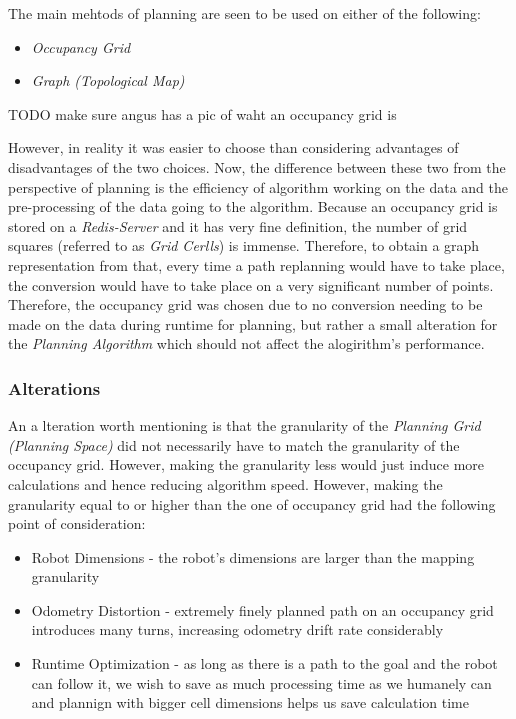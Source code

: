 \documentclass[11pt, a4paper]{article}
\begin{document}
The main mehtods\cite{path_space} of planning are seen to be used on either of the following:

\begin{itemize}
	\item \textit{Occupancy Grid}
	\item \textit{Graph (Topological Map)}
\end{itemize}

TODO make sure angus has a pic of waht an occupancy grid is

However, in reality it was easier to choose than considering advantages of disadvantages of the two choices. Now, the difference between these two from the perspective of planning is the efficiency of algorithm working on the data and the pre-processing of the data going to the algorithm. Because an occupancy grid is stored on a \textit{Redis-Server} and it has very fine definition, the number of grid squares (referred to as \textit{Grid Cerlls}) is immense. Therefore, to obtain a graph representation from that, every time a path replanning would have to take place, the conversion would have to take place on a very significant number of points. Therefore, the occupancy grid was chosen due to no conversion needing to be made on the data during runtime for planning, but rather a small alteration for the \textit{Planning Algorithm} which should not affect the alogirithm's performance.

\subsubsection{Alterations}

An a lteration worth mentioning is that the granularity of the \textit{Planning Grid (Planning Space)} did not necessarily have to match the granularity of the occupancy grid. However, making the granularity less would just induce more calculations and hence reducing algorithm speed. However,  making the granularity equal to or higher than the one of occupancy grid had the following point of consideration:

\begin{itemize}

	\item Robot Dimensions     - the robot's dimensions are larger than the mapping granularity
	\item Odometry Distortion  - extremely finely planned path on an occupancy grid introduces many turns, increasing odometry drift rate considerably \cite{task2_report}
	\item Runtime Optimization - as long as there is a path to the goal and the robot can follow it, we wish to save as much processing time as we humanely can and plannign with bigger cell dimensions helps us save calculation time

\end{itemize}
\end{document}
